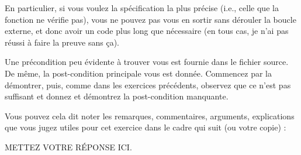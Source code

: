 \documentclass[11pt,answers]{exam}
\begin{document}
\begin{questions}
    En particulier, si vous voulez la spécification la plus précise (i.e., celle que la fonction  ne vérifie pas), vous ne pouvez pas vous en sortir sans dérouler la boucle externe, et donc avoir un code plus long que nécessaire (en tous cas, je n’ai pas réussi à faire la preuve sans ça).

    Une précondition peu évidente à trouver vous est fournie dans le fichier source.
    De même, la post-condition principale vous est donnée. Commencez par la démontrer, puis, comme dans les exercices précédents, observez que ce n’est pas suffisant et donnez et démontrez la post-condition manquante.

    Vous pouvez cela dit noter les remarques, commentaires, arguments, explications que vous jugez utiles pour cet exercice dans le cadre qui suit (ou votre copie) :

    \begin{solutionorbox}
        METTEZ VOTRE RÉPONSE ICI.
    \end{solutionorbox}


\end{questions}
\end{document}
